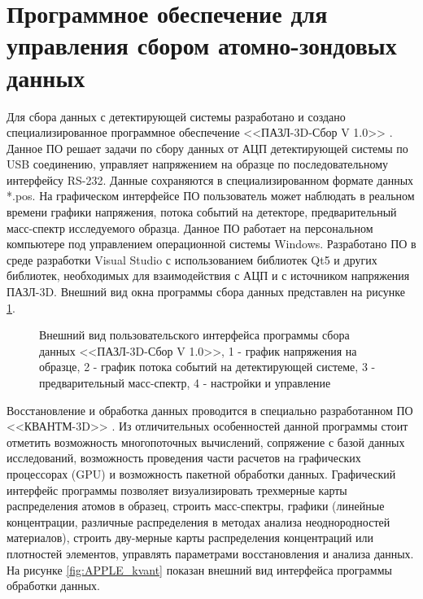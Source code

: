 \FloatBarrier

\section{Программное обеспечение для управления сбором атомно-зондовых данных}\label{sec:ch2/sec5}

Для сбора данных с детектирующей системы разработано и создано специализированное программное обеспечение <<ПАЗЛ-3D-Сбор V 1.0>> \cite{SBOR}. Данное ПО решает задачи по сбору данных от АЦП детектирующей системы по USB соединению, управляет напряжением на образце по последовательному интерфейсу RS-232. Данные сохраняются в специализированном формате данных *.pos. На графическом интерфейсе ПО пользователь может наблюдать в реальном времени графики напряжения, потока событий на детекторе, предварительный масс-спектр исследуемого образца. Данное ПО работает на персональном компьютере под управлением операционной системы Windows. Разработано ПО в среде разработки Visual Studio с использованием библиотек Qt5 и других библиотек, необходимых для взаимодействия с АЦП и с источником напряжения ПАЗЛ-3D. Внешний вид окна программы сбора данных представлен на рисунке \cref{fig:APPLE_sbor}.

\begin{figure}[htb]
	\caption{Внешний вид пользовательского интерфейса программы сбора данных  <<ПАЗЛ-3D-Сбор V 1.0>>, 1 - график напряжения на образце, 2 - график потока событий на детектирующей системе, 3 - предварительный масс-спектр, 4 - настройки и управление}
	\label{fig:APPLE_sbor}
\end{figure}

Восстановление и обработка данных проводится в специально разработанном ПО <<КВАНТМ-3D>> \cite{KVANTM}. Из отличительных особенностей данной программы стоит отметить возможность многопоточных вычислений, сопряжение с базой данных исследований, возможность проведения части расчетов на графических процессорах (GPU) и возможность пакетной обработки данных. Графический интерфейс программы позволяет визуализировать трехмерные карты распределения атомов в образец, строить масс-спектры, графики (линейные концентрации, различные распределения в методах анализа неоднородностей материалов), строить дву-мерные карты распределения концентраций или плотностей элементов, управлять параметрами восстановления и анализа данных. На рисунке \cref{fig:APPLE_kvant} показан внешний вид интерфейса программы обработки данных.

